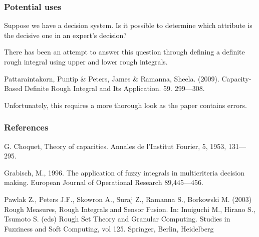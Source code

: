 \documentclass[envcountsect]{beamer}
\begin{document}
\begin{frame}
\frametitle{Potential uses}

Suppose we have a decision system. Is it possible to determine which attribute is the decisive one in an expert's decision? 

\vfill

There has been an attempt to answer this question through defining a definite rough integral using upper and lower rough integrals.

\vfill

Pattaraintakorn, Puntip \& Peters, James \& Ramanna, Sheela. (2009). Capacity-Based Definite Rough Integral and Its Application. 59. 299---308.
	
\vfill

Unfortunately, this requires a more thorough look as the paper contains errors.

\end{frame}

\begin{frame}
	\frametitle{References}
	G. Choquet, Theory of capacities. Annales de l'Institut Fourier, 5, 1953, 131---295.\\
	\vfill

Grabisch, M., 1996. The application of fuzzy integrals in multicriteria decision making. European Journal of Operational Research 89,445---456.
	\vfill

Pawlak Z., Peters J.F., Skowron A., Suraj Z., Ramanna S., Borkowski M. (2003) Rough Measures, Rough Integrals and Sensor Fusion. In: Inuiguchi M., Hirano S., Tsumoto S. (eds) Rough Set Theory and Granular Computing. Studies in Fuzziness and Soft Computing, vol 125. Springer, Berlin, Heidelberg

\end{frame}
	
\end{document}
